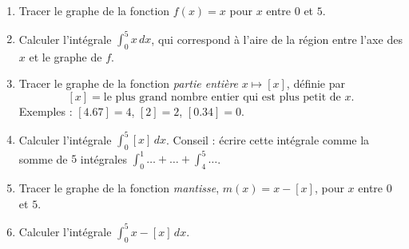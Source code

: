 
\begin{exercice}\label{exoExamenDecembre2010-0001}

  \begin{enumerate}
  \item Tracer le graphe de la fonction $f(x)=x$ pour $x$ entre $0$ et $5$.
    \item Calculer l'intégrale $\displaystyle \int_{0}^{5} x\, dx$, qui correspond à l'aire de la région entre l'axe des $x$ et le graphe de $f$.
      \item Tracer le graphe de la fonction \emph{partie entière} $x\mapsto [x]$, définie par 
        \[[x]=\textrm{le plus grand nombre entier qui est plus petit de } x.
        \]
        Exemples : $[4.67]=4$, $[2]=2$, $[0.34]=0$.
        \item Calculer l'intégrale $\displaystyle \int_{0}^{5} [x]\, dx$. Conseil : écrire cette intégrale comme la somme de $5$ intégrales $\int_{0}^{1}\ldots+ \ldots +\int_{4}^{5}\ldots$. 
          \item Tracer le graphe de la fonction \emph{mantisse}, $m(x)=x-[x]$, pour $x$ entre $0$ et $5$.
          \item Calculer l'intégrale $\displaystyle \int_{0}^{5} x-[x]\, dx$.
  \end{enumerate}
\end{exercice}
